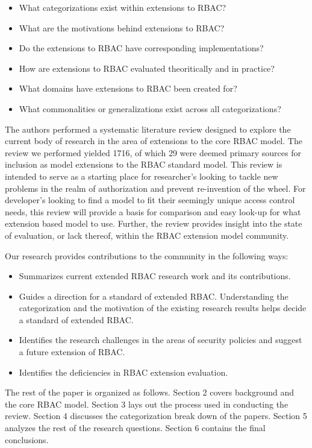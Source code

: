 \begin{itemize}
\setlength{\itemsep}{0.25pt}
\item What categorizations exist within extensions to RBAC?
\item What are the motivations behind extensions to RBAC?
\item Do the extensions to RBAC have corresponding implementations?
\item How are extensions to RBAC evaluated theoritically and in practice?
\item What domains have extensions to RBAC been created for?
\item What commonalities or generalizations exist across all categorizations?
\end{itemize}

The authors performed a systematic literature review designed to explore the current body of research in the area of extensions to the core RBAC model.  The review we performed yielded 1716, of which 29 were deemed primary sources for inclusion as model extensions to the RBAC standard model.  This review is intended to serve as a starting place for researcher's looking to tackle new problems in the realm of authorization and prevent re-invention of the wheel. For developer's looking to find a model to fit their seemingly unique access control needs, this review will provide a basis for comparison and easy look-up for what extension based model to use.  Further, the review provides insight into the state of evaluation, or lack thereof, within the RBAC extension model community.

Our research provides contributions to the community in the following ways:

\begin{itemize}
\setlength{\itemsep}{0.25pt}
\item Summarizes current extended RBAC research work and its contributions.
\item Guides a direction for a standard of extended RBAC. Understanding the categorization and the motivation of the existing research results helps decide a standard of extended RBAC.
\item Identifies the research challenges in the areas of security policies and suggest a future extension of RBAC.
\item Identifies the deficiencies in RBAC extension evaluation.
\end{itemize}

The rest of the paper is organized as follows.  Section 2 covers background and the core RBAC model. Section 3 lays out the process used in conducting the review. Section 4 discusses the categorization break down of the papers. Section 5 analyzes the rest of the research questions.  Section 6 contains the final conclusions.
